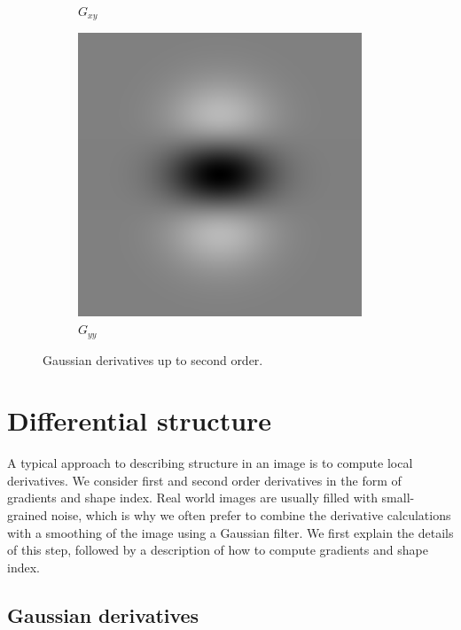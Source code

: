 \documentclass[thesis.tex]{subfiles}
\begin{document}
\begin{figure}[p]
\begin{subfigure}[t]{0.23\textwidth}
		\caption*{$G_{x y}$}
	\end{subfigure}
	\begin{subfigure}[t]{0.23\textwidth}
		\includegraphics[width=\textwidth]{img/gaussianDerivative_0_2.png}
		\caption*{$G_{yy}$}
	\end{subfigure}
	\caption{Gaussian derivatives up to second order.}
	\label{fig:gaussianDerivatives}
\end{figure}

\section{Differential structure}
\label{sec:diffStructure}
A typical approach to describing structure in an image is to compute local derivatives. We consider first and second order derivatives in the form of gradients and shape index. Real world images are usually filled with small-grained noise, which is why we often prefer to combine the derivative calculations with a smoothing of the image using a Gaussian filter. We first explain the details of this step, followed by a description of how to compute gradients and shape index.

\subsection{Gaussian derivatives}
\label{sec:gaussianDerivatives}
\end{document}
